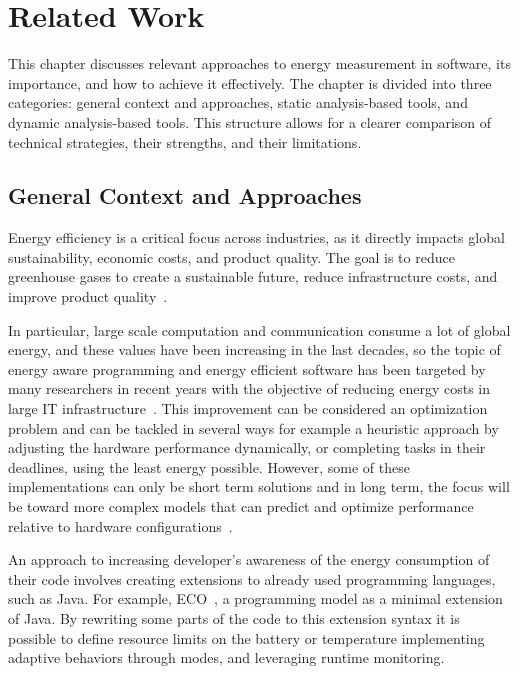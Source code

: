
\chapter{Related Work}\label{chapter:related_work}

This chapter discusses relevant approaches to energy measurement in software, its importance, and how to achieve it effectively. The chapter is divided into three categories: general context and approaches, static analysis-based tools, and dynamic analysis-based tools. This structure allows for a clearer comparison of technical strategies, their strengths, and their limitations.

\section{General Context and Approaches}

Energy efficiency is a critical focus across industries, as it directly impacts global sustainability, economic costs, and product quality.  The goal is to reduce greenhouse gases to create a sustainable future, reduce infrastructure costs, and improve product quality~\cite{annurev:/content/journals/10.1146/annurev.resource.102308.124234}. 

In particular, large scale computation and communication consume a lot of global energy, and these values have been increasing in the last decades, so the topic of energy aware programming and energy efficient software has been targeted by many researchers in recent years with the objective of reducing energy costs in large IT infrastructure~\cite{8880037}.
This improvement can be considered an optimization problem and can be tackled in several ways for example a heuristic approach by adjusting the hardware performance dynamically, or completing tasks in their deadlines, using the least energy possible. However, some of these implementations can only be short term solutions and in long term, the focus will be toward more complex models that can predict and optimize performance relative to hardware configurations~\cite{10.1145/1666420.1666438}. 

An approach to increasing developer's awareness of the energy consumption of their code involves creating extensions to already used programming languages, such as Java. For example, ECO~\cite{7194624}, a programming model as a minimal extension of Java. By rewriting some parts of the code to this extension syntax it is possible to define resource limits on the battery or temperature implementing adaptive behaviors through modes, and leveraging runtime monitoring.

